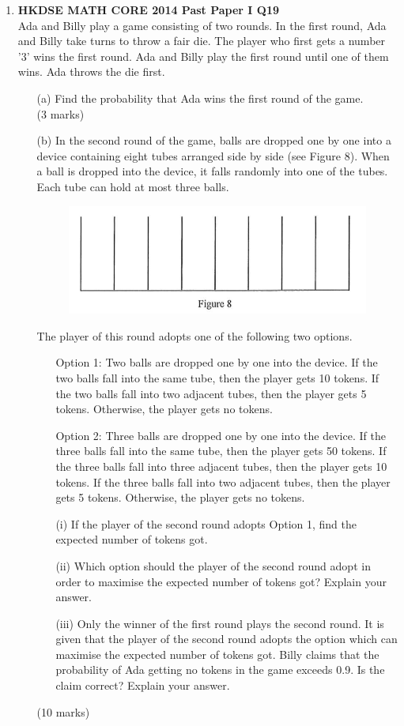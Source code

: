 \documentclass[12pt]{article}
\begin{document}
\begin{enumerate}
	\item \textbf{HKDSE MATH CORE 2014 Past Paper I Q19}\\
	Ada and Billy play a game consisting of two rounds. In the first round, Ada and Billy take turns to throw a fair die. The player who first gets a number '3' wins the first round. Ada and Billy play the first round until one of them wins. Ada throws the die first.
	\begin{enumerate}
		\item[(a)] Find the probability that Ada wins the first round of the game. \\(3 marks)
		\item[(b)] In the second round of the game, balls are dropped one by one into a device containing eight tubes arranged side by side (see Figure 8). When a ball is dropped into the device, it falls randomly into one of the tubes. Each tube can hold at most three balls.
		\begin{figure}[H]
			\centering
			\includegraphics[width = .3\linewidth]{2014Figure1.8}
		\end{figure}
		The player of this round adopts one of the following two options.
		\begin{enumerate}
			\item[Option 1:] Two balls are dropped one by one into the device. If the two balls fall into the same tube, then the player gets 10 tokens. If the two balls fall into two adjacent tubes, then the player gets 5 tokens. Otherwise, the player gets no tokens.
			\item[Option 2:] Three balls are dropped one by one into the device. If the three balls fall into the same tube, then the player gets 50 tokens. If the three balls fall into three adjacent tubes, then the player gets 10 tokens. If the three balls fall into two adjacent tubes, then the player gets 5 tokens. Otherwise, the player gets no tokens.
		\end{enumerate}
		\begin{enumerate}
			\item[(i)] If the player of the second round adopts Option 1, find the expected number of tokens got.
			\item[(ii)] Which option should the player of the second round adopt in order to maximise the expected number of tokens got? Explain your answer.
			\item[(iii)] Only the winner of the first round plays the second round. It is given that the player of the second round adopts the option which can maximise the expected number of tokens got. Billy claims that the probability of Ada getting no tokens in the game exceeds 0.9. Is the claim correct? Explain your answer.
		\end{enumerate}
		(10 marks)
	\end{enumerate}
\end{enumerate}
\end{document}
